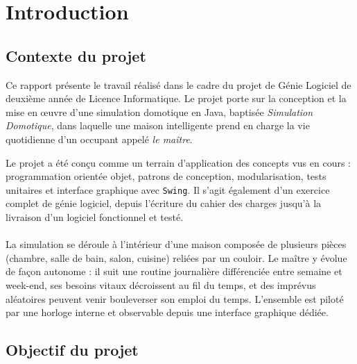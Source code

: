 \newpage
\section{Introduction}
\label{sec:intro}

\subsection{Contexte du projet}

Ce rapport présente le travail réalisé dans le cadre du projet de Génie Logiciel de deuxième année de Licence Informatique. Le projet porte sur la conception et la mise en œuvre d'une simulation domotique en Java, baptisée \textit{Simulation Domotique}, dans laquelle une maison intelligente prend en charge la vie quotidienne d'un occupant appelé \textit{le maître}.

Le projet a été conçu comme un terrain d'application des concepts vus en cours : programmation orientée objet, patrons de conception, modularisation, tests unitaires et interface graphique avec \texttt{Swing}. Il s'agit également d'un exercice complet de génie logiciel, depuis l'écriture du cahier des charges jusqu'à la livraison d'un logiciel fonctionnel et testé.

\paragraph{} La simulation se déroule à l'intérieur d'une maison composée de plusieurs pièces (chambre, salle de bain, salon, cuisine) reliées par un couloir. Le maître y évolue de façon autonome : il suit une routine journalière différenciée entre semaine et week-end, ses besoins vitaux décroissent au fil du temps, et des imprévus aléatoires peuvent venir bouleverser son emploi du temps. L'ensemble est piloté par une horloge interne et observable depuis une interface graphique dédiée.

\subsection{Objectif du projet}

